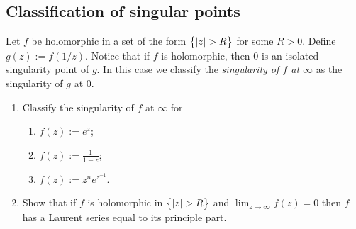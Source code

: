 \documentclass[11pt,a4paper]{article}
\begin{document}
\subsection{Classification of singular points}
\begin{exercise}
  Let $f$ be holomorphic in a set of the form $\left\{|z| > R\right\}$ for some
  $R > 0$.
  Define $g(z) := f(1 / z)$.
  Notice that if $f$ is holomorphic, then $0$ is an isolated singularity
  point of $g$.
  In this case we classify the \textit{singularity of $f$ at $\infty$} as the
  singularity of $g$ at $0$.
  \begin{enumerate}
    \item[(1)] Classify the singularity of $f$ at $\infty$ for
      \begin{enumerate}
        \item[(a)] $f(z) := e^z$;
        \item[(b)] $f(z) := \frac{1}{1-z}$;
        \item[(c)] $f(z) := z^n e^{z^{-1}}$.
      \end{enumerate}
    \item[(2)] Show that if $f$ is holomorphic in $\left\{|z| > R\right\}$ and
      $\lim_{z \to \infty} f(z) = 0$
      then $f$ has a Laurent series equal to its principle part.
  \end{enumerate}
\end{exercise}
\end{document}
